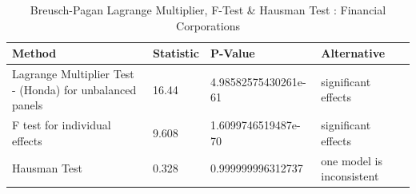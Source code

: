 \begin{table}[ht]
\centering
\caption{Breusch-Pagan Lagrange Multiplier, F-Test & Hausman Test : Financial Corporations} 
\begingroup\small
\begin{tabular}{llll}
  \toprule
Method & Statistic & P-Value & Alternative \\ 
  \midrule
Lagrange Multiplier Test -  (Honda) for unbalanced panels & 16.44 & 4.98582575430261e-61 & significant effects \\ 
  F test for individual effects & 9.608 & 1.6099746519487e-70 & significant effects \\ 
  Hausman Test & 0.328 & 0.999999996312737 & one model is inconsistent \\ 
   \bottomrule
\end{tabular}
\endgroup
\end{table}
